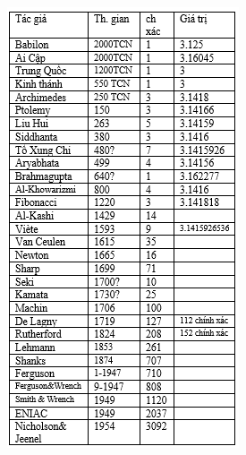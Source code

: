 \begin{multicols}{2}
\begin{figure}[H]
		\includegraphics[width= 1\linewidth]{4}
		\vspace*{-10pt}
	\end{figure}

\end{multicols}
